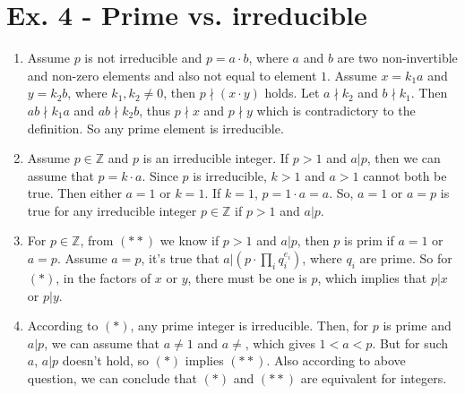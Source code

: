\documentclass[11pt,a4paper]{article}
\begin{document}
\section*{Ex. 4 - Prime vs. irreducible}
\begin{enumerate}
\item Assume $p$ is not irreducible and $p = a \cdot b$, where $a$ and $b$ are two non-invertible and non-zero elements and also not equal to element $1$. Assume $x = k_{1}a$ and $y = k_{2}b$, where $k_{1}, k_{2} \neq 0$, then $p \nmid (x \cdot y)$ holds. Let $a \nmid k_{2}$ and $b \nmid k_{1}$. Then $ab \nmid k_{1}a$ and $ab \nmid k_{2}b$, thus $p \nmid x$ and $p \nmid y$ which is contradictory to the definition. So any prime element is irreducible.

\item Assume $p \in \mathbb{Z}$ and $p$ is an irreducible integer. If $p > 1$ and $a \vert p$, then we can assume that $p = k \cdot a$. Since $p$ is irreducible, $k > 1$ and $a > 1$ cannot both be true. Then either $a = 1$ or $k = 1$. If $k = 1$, $p = 1 \cdot a = a$. So, $a = 1$ or $a = p$ is true for any irreducible integer $p \in \mathbb{Z}$ if $p > 1$ and $a \vert p$.

\item For $p \in \mathbb{Z}$, from $(**)$ we know if $p > 1$ and $a \vert p$, then $p$ is prim if $a = 1$ or $a = p$. Assume $a = p$, it's true that $a \vert (p \cdot \prod_{i} q_{i}^{e_{i}})$, where $q_{i}$ are prime. So for $(*)$, in the factors of $x$ or $y$, there must be one is $p$, which implies that $p\vert x$ or $p\vert y$.

\item According to $(*)$, any prime integer is irreducible. Then, for $p$ is prime and $a \vert p$, we can assume that $a \neq 1$ and $a \neq $, which gives $1 < a < p$. But for such $a$, $a \vert p$ doesn't hold, so $(*)$ implies $(**)$. Also according to above question, we can conclude that $(*)$ and $(**)$ are equivalent for integers.
\end{enumerate}
\end{document}
